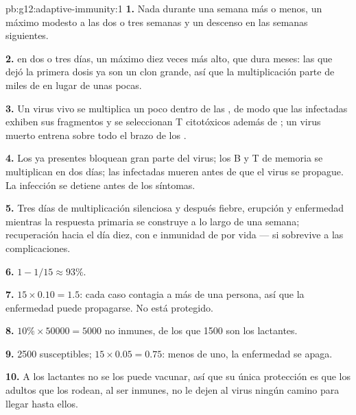 \begin{solution}{pb:g12:adaptive-immunity:1}
\textbf{1.} Nada durante una semana más o menos, un máximo modesto a
las dos o tres semanas y un descenso en las semanas siguientes.

\textbf{2.}  en dos o tres días, un máximo diez veces más
alto, que dura meses: las  que dejó la primera dosis
ya son un clon grande, así que la multiplicación parte de miles de
 en lugar de unas pocas.

\textbf{3.} Un virus vivo se multiplica un poco dentro de las ,
de modo que las  infectadas exhiben sus fragmentos y se
seleccionan  T citotóxicos además de ; un virus
muerto entrena sobre todo el brazo de los .

\textbf{4.} Los  ya presentes bloquean gran parte del virus;
los  B y T de memoria se multiplican en dos días; las 
infectadas mueren antes de que el virus se propague. La infección se
detiene antes de los síntomas.

\textbf{5.} Tres días de multiplicación silenciosa y después fiebre,
erupción y enfermedad mientras la respuesta primaria se construye a lo
largo de una semana; recuperación hacia el día diez, con  e inmunidad de por vida --- si sobrevive a las complicaciones.

\textbf{6.} $1 - 1/15 \approx 93\%$.

\textbf{7.} $15 \times 0.10 = 1.5$: cada caso contagia a más de una
persona, así que la enfermedad puede propagarse. No está protegido.

\textbf{8.} $10\% \times \num{50000} = 5000$ no inmunes, de los que
1500 son los lactantes.

\textbf{9.} 2500 susceptibles; $15 \times 0.05 = 0.75$: menos de uno,
la enfermedad se apaga.

\textbf{10.} A los lactantes no se los puede vacunar, así que su única
protección es que los adultos que los rodean, al ser inmunes, no le
dejen al virus ningún camino para llegar hasta ellos.


\end{solution}
